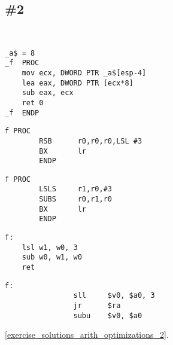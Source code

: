 \section{\Exercises}


\subsection{\Exercise \#2}
\label{exercise_arith_optimizations_2}

\WhatThisCodeDoes\

\begin{lstlisting}[caption=\Optimizing MSVC 2010]
_a$ = 8
_f	PROC
	mov	ecx, DWORD PTR _a$[esp-4]
	lea	eax, DWORD PTR [ecx*8]
	sub	eax, ecx
	ret	0
_f	ENDP
\end{lstlisting}

\begin{lstlisting}[caption=\NonOptimizingKeilVI (\ARMMode)]
f PROC
        RSB      r0,r0,r0,LSL #3
        BX       lr
        ENDP
\end{lstlisting}

\begin{lstlisting}[caption=\NonOptimizingKeilVI (\ThumbMode)]
f PROC
        LSLS     r1,r0,#3
        SUBS     r0,r1,r0
        BX       lr
        ENDP
\end{lstlisting}

\begin{lstlisting}[caption=\Optimizing GCC 4.9 (ARM64)]
f:
	lsl	w1, w0, 3
	sub	w0, w1, w0
	ret
\end{lstlisting}

\begin{lstlisting}[caption=\Optimizing GCC 4.4.5 (MIPS) (IDA)]
f:
                sll     $v0, $a0, 3
                jr      $ra
                subu    $v0, $a0
\end{lstlisting}

\Answer\: \ref{exercise_solutions_arith_optimizations_2}.
